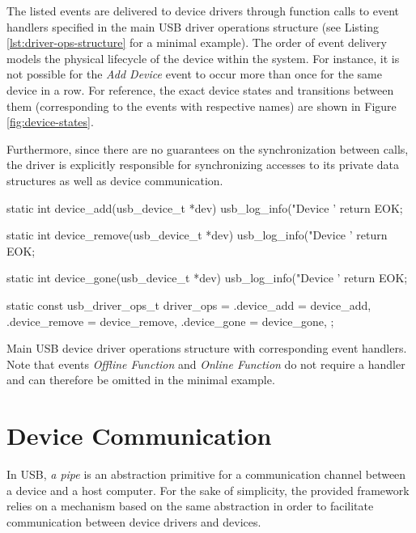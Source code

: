 The listed events are delivered to device drivers through function calls to
event handlers specified in the main USB driver operations structure (see
Listing \ref{lst:driver-ops-structure} for a minimal example). The order of
event delivery models the physical lifecycle of the device within the system.
For instance, it is not possible for the \textit{Add Device} event to occur more
than once for the same device in a row. For reference, the exact device states
and transitions between them (corresponding to the events with respective names)
are shown in Figure \ref{fig:device-states}.

Furthermore, since there are no guarantees on the synchronization between calls,
the driver is explicitly responsible for synchronizing accesses to its private
data structures as well as device communication.

\begin{listing}
	\begin{code}
		static int device_add(usb_device_t *dev)
		{
			usb_log_info("Device '%
			return EOK;
		}

		static int device_remove(usb_device_t *dev)
		{
			usb_log_info("Device '%
			return EOK;
		}

		static int device_gone(usb_device_t *dev)
		{
			usb_log_info("Device '%
			return EOK;
		}

		static const usb_driver_ops_t driver_ops = {
			.device_add = device_add,
			.device_remove = device_remove,
			.device_gone = device_gone,
		};
	\end{code}
	\caption[Main USB device driver operations structure.]{Main USB device
	driver operations structure with corresponding event handlers. Note that
	events \textit{Offline Function} and \textit{Online Function} do not require
	a handler and can therefore be omitted in the minimal example.}
	\label{lst:driver-ops-structure}
\end{listing}


\section{Device Communication}

In USB, \textit{a pipe} is an abstraction primitive for a communication channel
between a device and a host computer. For the sake of simplicity, the provided
framework relies on a mechanism based on the same abstraction in order to
facilitate communication between device drivers and devices.


